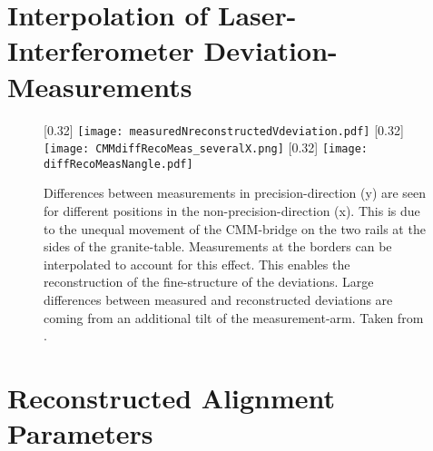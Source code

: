 \documentclass[
twoside,            %
BCOR1.4cm,          %
10pt,               %
headings=normal,    %
headsepline,        %
clearplainpage,		%
final,              %
div=14,
open=right,
bibliography=toc
]{scrreprt}
\begin{document}
\chapter{Interpolation of Laser-Interferometer Deviation-Measurements}

\begin{figure}[!h]
	\centering
	[0.32\textwidth]
	{\texttt{[image: measuredNreconstructedVdeviation.pdf]}}
	\hfill
	[0.32\textwidth]
	{\texttt{[image: CMMdiffRecoMeas\_severalX.png]}}
	\hfill
	[0.32\textwidth]
	{\texttt{[image: diffRecoMeasNangle.pdf]}}
	\vspace{-2mm}
	\caption{
		Differences between measurements in precision-direction (y) are seen for different positions in the non-precision-direction (x).
		This is due to the unequal movement of the CMM-bridge on the two rails at the sides of the granite-table.
		Measurements at the borders can be interpolated to account for this effect.
		This enables the reconstruction of the fine-structure of the deviations.
		Large differences between measured and reconstructed deviations are coming from an additional tilt of the measurement-arm.
		Taken from \cite{feilThesis}.
	}
	\label{deviationInterpolation} 
\end{figure}

\chapter{Reconstructed Alignment Parameters}
\label{reconstructedAlignmentParameter}
\end{document}
